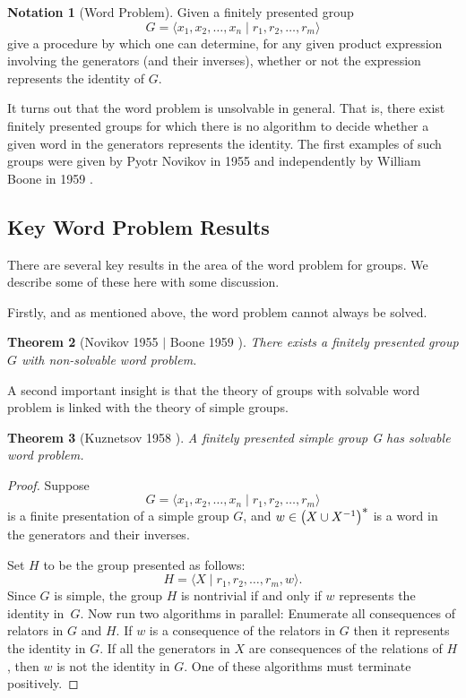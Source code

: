 \documentclass[usenames,dvipsnames]{amsart}
\newtheorem{theorem}{Theorem}[section]
\theoremstyle{definition}
\newtheorem{notation}[theorem]{Notation}
\renewcommand{\star}{\text{\small$*$}}
\begin{document}
 \begin{notation}[Word Problem] Given a finitely presented group
\[G = \langle x_1,x_2,\ldots,x_n\mid r_1,r_2,\ldots,r_m\rangle\]%
give a procedure by which one can determine, for any given product expression involving the generators (and their inverses), whether or not the expression represents the identity of $G$.
\end{notation}

It turns out that the word problem is unsolvable in general.  That is, there exist finitely presented groups for which there is no algorithm to decide whether a given word in the generators represents the identity.  The first examples of such groups were given by Pyotr Novikov in 1955 \cite{Novikov55} and independently by William Boone in 1959 \cite{Boone59}.

 
 \subsection{Key Word Problem Results}
 There are several key results in the area of the word problem for groups.  We describe some of these here with some discussion.
 
 Firstly, and as mentioned above, the word problem cannot always be solved.
 \begin{theorem}[Novikov 1955 \cite{Novikov55} $\mid$ Boone 1959 \cite{Boone59}]
 There exists a finitely presented group $G$ with non-solvable word problem. 
 \end{theorem}
 A second important insight is that the theory of groups with solvable word problem is linked with the theory of simple groups.
\begin{theorem}[Kuznetsov 1958 \cite{Kuznetsov}]
A finitely presented simple group G has solvable word problem.
\end{theorem}
\begin{proof}
Suppose 
\[
G = \langle x_1,x_2,\ldots,x_n\mid r_1,r_2,\ldots,r_m\rangle
\]
is a finite presentation of a simple group $G$, and $w\in \bigl(X\cup X^{-1}\bigr)^{\star}$ is a word in the generators and their inverses.

Set $H$ to be the group presented as follows:
\[
H=\langle X\mid r_1,r_2,\ldots,r_m,w\rangle.
\]
Since $G$ is simple, the group $H$ is nontrivial if and only if $w$ represents the identity in~$G$. Now run two algorithms in parallel: Enumerate all consequences of relators in $G$ and $H$.  If $w$ is a consequence of the relators in $G$ then it represents the identity in $G$.  If all the generators in $X$ are consequences of the relations of $H$, then $w$ is not the identity in $G$.  One of these algorithms must terminate positively.
\end{proof}
\end{document}
